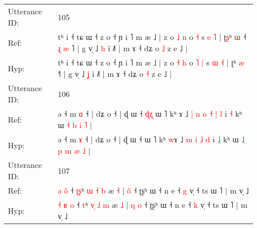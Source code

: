 \documentclass[10pt]{article}
\DeclareRobustCommand{\hl}[1]{{\textcolor{red}{#1}}}
\begin{document}
\begin{longtable}{ll}
 \\
\midrule
Utterance ID: & 105 \\
Ref: & tʰ i ˧ tɕ ɯ ˧ z o ˧ ɲ i ˥ m æ ˩ | z o \hl{˩} \hl{n} o\hl{}\hl{} \hl{˧} s \hl{e} \hl{˥} | ʈ\hl{ʂ}ʰ \hl{ɯ} ˧\hl{ }\hl{ɻ}\hl{ }\hl{æ}\hl{ }˥ | g v̩ ˩ \hl{h} i\hl{̃} ˩˥ | m ɤ ˧ dʑ o \hl{˩} z e ˩ |
 \\
Hyp: & tʰ i ˧ tɕ ɯ ˧ z o ˧ ɲ i ˥ m æ ˩ | z o \hl{˧} \hl{h} o\hl{ }\hl{˥} \hl{|} s \hl{ɯ} \hl{˧} | ʈ\hl{}ʰ \hl{æ} ˧\hl{}\hl{}\hl{}\hl{}\hl{}˥ | g v̩ ˩ \hl{ʝ} i\hl{} ˩˥ | m ɤ ˧ dʑ o \hl{˧} z e ˩ |
 \\
\midrule
Utterance ID: & 106 \\
Ref: & ə ˧ m \hl{ɑ} ˧ | dʑ o ˧ | ɖ ɯ ˧\hl{ }\hl{ɖ}\hl{ʐ} ɯ ˥ kʰ \hl{}ɤ ˩\hl{ }\hl{|}\hl{ }\hl{n} \hl{o} \hl{˧} \hl{|} \hl{l} i \hl{˧} kʰ ɯ\hl{}\hl{} \hl{˧} \hl{b} \hl{i} \hl{˥} |
 \\
Hyp: & ə ˧ m \hl{ɤ} ˧ | dʑ o ˧ | ɖ ɯ ˧\hl{}\hl{}\hl{} ɯ ˥ kʰ \hl{w}ɤ ˩\hl{}\hl{}\hl{}\hl{} \hl{m} \hl{i} \hl{˩} \hl{d} i \hl{˩} kʰ ɯ\hl{ }\hl{˩} \hl{p} \hl{m} \hl{æ} \hl{˩} |
 \\
\midrule
Utterance ID: & 107 \\
Ref: & \hl{ə} \hl{}\hl{o}\hl{̃} ˧ \hl{ʈ}\hl{ʂ}ʰ \hl{}\hl{ɯ} \hl{˧} \hl{b} æ \hl{˧} | \hl{}\hl{o}\hl{̃} ˧ ʈʂʰ ɯ ˧ n e ˧ \hl{g} v̩ ˧ ts ɯ ˥ | m v̩ ˩
 \\
Hyp: & \hl{˧} \hl{ʁ}\hl{ }\hl{o} ˧ \hl{}\hl{t}ʰ \hl{v}\hl{̩} \hl{˩} \hl{m} æ \hl{˩} | \hl{q}\hl{ }\hl{o} ˧ ʈʂʰ ɯ ˧ n e ˧ \hl{k} v̩ ˧ ts ɯ ˥ | m v̩ ˩
 \\
\midrule
\end{longtable}
\end{document}
